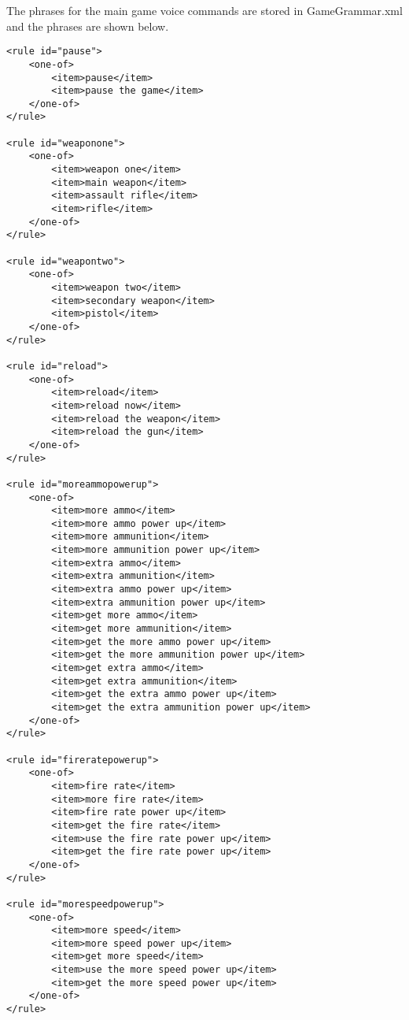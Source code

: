 \documentclass{article}
\begin{document}
The phrases for the main game voice commands are stored in GameGrammar.xml and the phrases are shown below.
\begin{verbatim}
<rule id="pause">
    <one-of>
        <item>pause</item>
        <item>pause the game</item>
    </one-of>
</rule>

<rule id="weaponone">
    <one-of>
        <item>weapon one</item>
        <item>main weapon</item>
        <item>assault rifle</item>
        <item>rifle</item>
    </one-of>
</rule>

<rule id="weapontwo">
    <one-of>
        <item>weapon two</item>
        <item>secondary weapon</item>
        <item>pistol</item>
    </one-of>
</rule>

<rule id="reload">
    <one-of>
        <item>reload</item>
        <item>reload now</item>
        <item>reload the weapon</item>
        <item>reload the gun</item>
    </one-of>
</rule>

<rule id="moreammopowerup">
    <one-of>
        <item>more ammo</item>
        <item>more ammo power up</item>
        <item>more ammunition</item>
        <item>more ammunition power up</item>
        <item>extra ammo</item>
        <item>extra ammunition</item>
        <item>extra ammo power up</item>
        <item>extra ammunition power up</item>
        <item>get more ammo</item>
        <item>get more ammunition</item>
        <item>get the more ammo power up</item>
        <item>get the more ammunition power up</item>
        <item>get extra ammo</item>
        <item>get extra ammunition</item>
        <item>get the extra ammo power up</item>
        <item>get the extra ammunition power up</item>
    </one-of>
</rule>

<rule id="fireratepowerup">
    <one-of>
        <item>fire rate</item>
        <item>more fire rate</item>
        <item>fire rate power up</item>
        <item>get the fire rate</item>
        <item>use the fire rate power up</item>
        <item>get the fire rate power up</item>
    </one-of>
</rule>

<rule id="morespeedpowerup">
    <one-of>
        <item>more speed</item>
        <item>more speed power up</item>
        <item>get more speed</item>
        <item>use the more speed power up</item>
        <item>get the more speed power up</item>
    </one-of>
</rule>
\end{verbatim}
\end{document}
